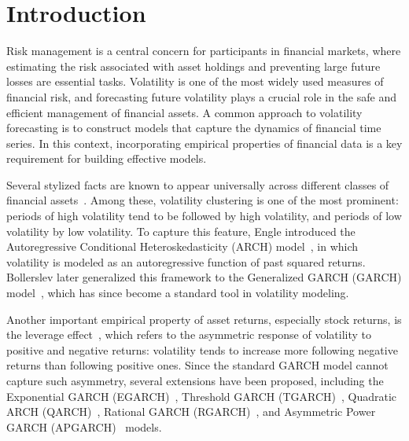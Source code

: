 \documentclass[preprints,article,accept,pdftex,oneauthor]{Definitions/mdpi}
\begin{document}
\section{Introduction}
Risk management is a central concern for participants in financial markets, where estimating the risk associated with asset holdings and preventing large future losses are essential tasks. Volatility is one of the most widely used measures of financial risk, and forecasting future volatility plays a crucial role in the safe and efficient management of financial assets. A common approach to volatility forecasting is to construct models that capture the dynamics of financial time series. In this context, incorporating empirical properties of financial data is a key requirement for building effective models.

Several stylized facts are known to appear universally across different classes of financial assets~\cite{Cont2001QF}. Among these, volatility clustering is one of the most prominent: periods of high volatility tend to be followed by high volatility, and periods of low volatility by low volatility. To capture this feature, Engle introduced the Autoregressive Conditional Heteroskedasticity (ARCH) model~\cite{Engle1982autoregressive}, in which volatility is modeled as an autoregressive function of past squared returns. Bollerslev later generalized this framework to the Generalized GARCH (GARCH) model~\cite{Bollerslev1986JOE}, which has since become a standard tool in volatility modeling.


Another important empirical property of asset returns, especially stock returns, is the leverage effect~\cite{Black1976,Christie1982stochastic}, which refers to the asymmetric response of volatility to positive and negative returns: volatility tends to increase more following negative returns than following positive ones. Since the standard GARCH model cannot capture such asymmetry, several extensions have been proposed, including the Exponential GARCH (EGARCH)~\cite{Nelson1991Econ}, Threshold GARCH (TGARCH)~\cite{Glosten1993JOF}, Quadratic ARCH (QARCH)~\cite{Sentana1995RES}, Rational GARCH (RGARCH)~\cite{takaishi2017rational,takaishi2018volatility}, and Asymmetric Power GARCH (APGARCH)~\cite{ding1993long} models.
\end{document}
